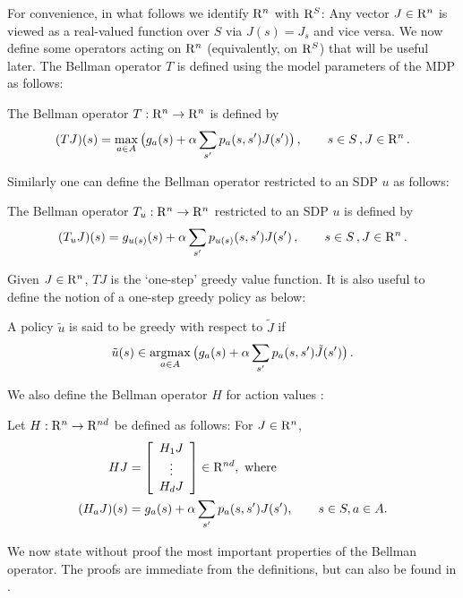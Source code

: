 For convenience, in what follows we identify $\mathrm{R}^n$ with $\mathrm{R}^{S}$:
Any vector $J\in \mathrm{R}^n$ is viewed as a real-valued function over $S$ via $J(s) = J_s$ and vice versa.
We now define some operators acting on $\mathrm{R}^n$ (equivalently, on $\mathrm{R}^S$) that will be useful later.
The Bellman operator $T$ is defined using the model parameters of the MDP as follows:
\begin{definition}
The Bellman operator $T: \mathrm{R}^n \to \mathrm{R}^n$ is defined by 
\begin{align}
(TJ)(s)=\max_{a \in A}\big(g_a(s)+\alpha \sum_{s'} p_a(s,s')J(s')\big)\,,  \qquad s\in S\,,J\in \mathrm{R}^n\,.
\end{align}
\end{definition}
Similarly one can define the Bellman operator restricted to an SDP $u$ as follows:
\begin{definition}
The Bellman operator $T_u:\mathrm{R}^n \to \mathrm{R}^n$  restricted to an SDP $u$ is defined by
\begin{align}
(T_uJ)(s)=g_{u(s)}(s)+\alpha \sum_{s'} p_{u(s)}(s,s')J(s')\,,  \qquad s\in S\,,J\in \mathrm{R}^n\,.
\end{align}
\end{definition}
Given $J \in \mathrm{R}^n$, $TJ$ is the `one-step' greedy value function. It is also useful to define the notion of a one-step greedy policy as below:
\begin{definition}
A policy $\tilde{u}$ is said to be greedy with respect to $\tilde{J}$ if
\begin{align}\label{subpol}
\tilde{u}(s)\in \underset{a \in A}{\argmax} \, \big(g_a(s)+\alpha\sum_{s'} p_a(s,s')\tilde{J}(s')\big)\,.
\end{align}
\end{definition}
We also define the Bellman operator $H$ for action values  \cite{BertB}: 
\begin{definition}\label{bellactval}
Let $H: \mathrm{R}^n \to \mathrm{R}^{nd}$ be defined as follows: For $J\in \mathrm{R}^n$,
\begin{align}
HJ&=\left[ {\begin{array}{c} H_1 J  \\ \vdots \\ H_d J\end{array}} \right]\in \mathrm{R}^{nd}, \text{ where}\nonumber\\
(H_a J)(s)&= g_a(s)+\alpha \sum_{s'}p_a(s,s') J(s'), \qquad s\in S, a\in A.
\end{align}
\end{definition}
We now state without proof the most important properties of the Bellman operator.
The proofs are immediate from the definitions, but can also be found in \cite{BertB}.

